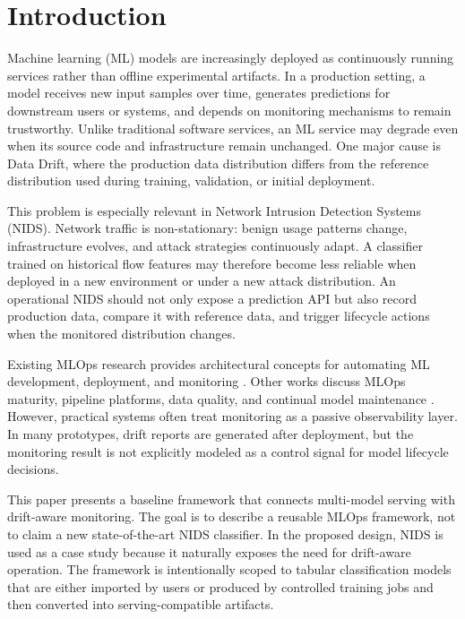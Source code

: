 \documentclass[runningheads]{llncs}
\begin{document}
\section{Introduction}

Machine learning (ML) models are increasingly deployed as continuously running services rather than offline experimental artifacts. In a production setting, a model receives new input samples over time, generates predictions for downstream users or systems, and depends on monitoring mechanisms to remain trustworthy. Unlike traditional software services, an ML service may degrade even when its source code and infrastructure remain unchanged. One major cause is Data Drift, where the production data distribution differs from the reference distribution used during training, validation, or initial deployment.

This problem is especially relevant in Network Intrusion Detection Systems (NIDS). Network traffic is non-stationary: benign usage patterns change, infrastructure evolves, and attack strategies continuously adapt. A classifier trained on historical flow features may therefore become less reliable when deployed in a new environment or under a new attack distribution. An operational NIDS should not only expose a prediction API but also record production data, compare it with reference data, and trigger lifecycle actions when the monitored distribution changes.

Existing MLOps research provides architectural concepts for automating ML development, deployment, and monitoring \cite{kreuzberger2023mlops}. Other works discuss MLOps maturity, pipeline platforms, data quality, and continual model maintenance \cite{john2021towards,subramanya2022devops,renggli2021data}. However, practical systems often treat monitoring as a passive observability layer. In many prototypes, drift reports are generated after deployment, but the monitoring result is not explicitly modeled as a control signal for model lifecycle decisions.

This paper presents a baseline framework that connects multi-model serving with drift-aware monitoring. The goal is to describe a reusable MLOps framework, not to claim a new state-of-the-art NIDS classifier. In the proposed design, NIDS is used as a case study because it naturally exposes the need for drift-aware operation. The framework is intentionally scoped to tabular classification models that are either imported by users or produced by controlled training jobs and then converted into serving-compatible artifacts.
\end{document}
